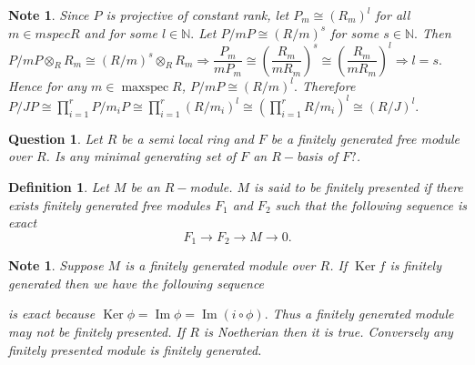 \documentclass[11pt]{amsart}
\newtheorem{defn}[theorem]{Definition}
\newtheorem{qns}[theorem]{Question}
\newtheorem{note}[theorem]{Note}
\newcommand{\NN}{\mathbb N}
\DeclareMathOperator{\im}{\text{Im}}
\DeclareMathOperator{\Ker}{\text{Ker}}
\DeclareMathOperator{\mspec}{\text{maxspec}}
\begin{document}
\begin{note}

Since $P$ is projective of constant rank, let $P_m\cong (R_m)^l$ for all $m\in mspec R$ and for some $l\in{\NN}.$ Let $P/mP\cong (R/m)^s$ for some $s\in {\NN}.$ Then $P/mP\otimes_R R_m\cong (R/m)^s\otimes_R R_m \Rightarrow \dfrac{P_m}{mP_m}\cong \left(\dfrac{R_m}{mR_m}\right)^s\cong \left(\dfrac{R_m}{mR_m}\right)^l\Rightarrow l=s.$ Hence for any $m\in\mspec R$, $P/mP\cong (R/m)^l.$ Therefore $P/JP\cong \displaystyle\prod_{i=1}^r P/m_iP\cong \displaystyle\prod_{i=1}^r (R/m_i)^l\cong \left(\displaystyle\prod_{i=1}^r R/m_i\right)^l\cong (R/J)^l.$

\end{note}

\begin{qns}

Let $R$ be a semi local ring and $F$ be a finitely generated free module over $R$. Is any minimal generating set of $F$ an $R-$basis of $F?$.

\end{qns}


\begin{defn}

Let $M$ be an $R-$module. $M$ is said to be finitely presented if there exists finitely generated free modules $F_1$ and $F_2$ such that the following sequence is exact $$F_1\to F_2\to M\to 0.$$

\end{defn}


\begin{note}
Suppose $M$ is a finitely generated module over $R$. If $\Ker f$ is finitely generated then we have the following sequence

\begin{center}
\end{center}

 is exact because $\Ker \phi=\im\phi=\im (i\circ \phi).$ Thus a finitely generated module may not be finitely presented. If $R$ is Noetherian then it is true. Conversely any finitely presented module is finitely generated.

\end{note}
\end{document}
